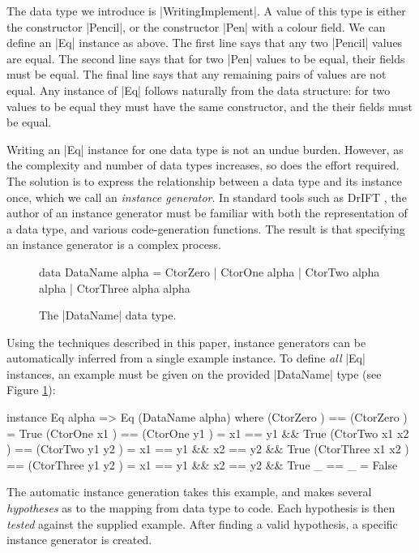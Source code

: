 \documentclass{llncs}
\begin{document}
The data type we introduce is |WritingImplement|. A value of this type is either the constructor |Pencil|, or the constructor |Pen| with a colour field. We can define an |Eq| instance as above. The first line says that any two |Pencil| values are equal. The second line says that for two |Pen| values to be equal, their fields must be equal. The final line says that any remaining pairs of values are not equal. Any instance of |Eq| follows naturally from the data structure: for two values to be equal they must have the same constructor, and the their fields must be equal.

Writing an |Eq| instance for one data type is not an undue burden. However, as the complexity and number of data types increases, so does the effort required. The solution is to express the relationship between a data type and its instance once, which we call an \textit{instance generator}. In standard tools such as DrIFT \cite{drift}, the author of an instance generator must be familiar with both the representation of a data type, and various code-generation functions. The result is that specifying an instance generator is a complex process. 

\begin{figure}
\begin{code}
data DataName alpha  =  CtorZero
                     |  CtorOne    alpha
                     |  CtorTwo    alpha  alpha
                     |  CtorThree  alpha  alpha
\end{code}
\caption{The |DataName| data type.}
\label{fig:dataname}
\end{figure}

Using the techniques described in this paper, instance generators can be automatically inferred from a single example instance. To define \textit{all} |Eq| instances, an example must be given on the provided |DataName| type (see Figure \ref{fig:dataname}):

\begin{code}
instance Eq alpha => Eq (DataName alpha) where
    (CtorZero          )  == (CtorZero          )  = True
    (CtorOne    x1     )  == (CtorOne    y1     )  = x1 == y1 && True
    (CtorTwo    x1 x2  )  == (CtorTwo    y1 y2  )  = x1 == y1 && x2 == y2 && True
    (CtorThree  x1 x2  )  == (CtorThree  y1 y2  )  = x1 == y1 && x2 == y2 && True
    _                     == _                     = False
\end{code}

The automatic instance generation takes this example, and makes several \textit{hypotheses} as to the mapping from data type to code. Each hypothesis is then \textit{tested} against the supplied example. After finding a valid hypothesis, a specific instance generator is created.
\end{document}
